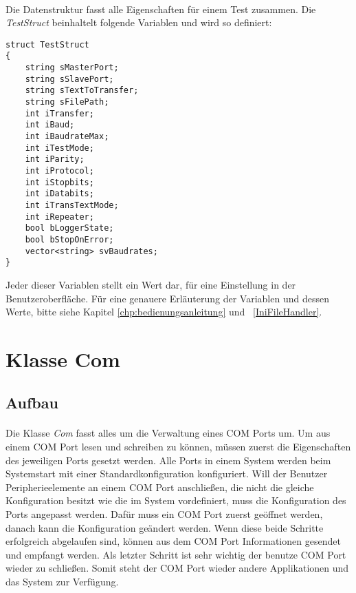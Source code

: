 \paragraph{}
Die Datenstruktur fasst alle Eigenschaften für einem Test zusammen. Die \textit{TestStruct} beinhaltelt folgende Variablen und wird so definiert:\\
\begin{lstlisting}	 
struct TestStruct
{
	string sMasterPort;
	string sSlavePort;
	string sTextToTransfer;
	string sFilePath;
	int iTransfer;
	int iBaud;
	int iBaudrateMax;
	int iTestMode;
	int iParity;
	int iProtocol;
	int iStopbits;
	int iDatabits;
	int iTransTextMode;
	int iRepeater;
	bool bLoggerState;
	bool bStopOnError;
	vector<string> svBaudrates;
}
\end{lstlisting}

Jeder dieser Variablen stellt ein Wert dar, für eine Einstellung in der Benutzeroberfläche. Für eine genauere Erläuterung der Variablen und dessen Werte, bitte siehe Kapitel \ref{chp:bedienungsanleitung} und ~\ref{IniFileHandler}.

\newpage


\section{Klasse Com}
\subsection{Aufbau}
\paragraph{}
Die Klasse \textit{Com} fasst alles um die Verwaltung eines COM Ports um. Um aus einem COM Port lesen und schreiben zu können, müssen zuerst die Eigenschaften des jeweiligen Ports gesetzt werden. Alle Ports in einem System werden beim Systemstart mit einer Standardkonfiguration konfiguriert. Will der Benutzer Peripherieelemente an einem COM Port anschließen, die nicht die gleiche Konfiguration besitzt wie die  im System vordefiniert, muss die Konfiguration des Ports angepasst werden. Dafür muss ein COM Port zuerst geöffnet werden, danach kann die Konfiguration geändert werden. Wenn diese beide Schritte erfolgreich abgelaufen sind, können aus dem COM Port Informationen gesendet und empfangt werden. Als letzter Schritt ist sehr wichtig der benutze COM Port wieder zu schließen. Somit steht der COM Port wieder andere Applikationen und das System zur Verfügung.\\

